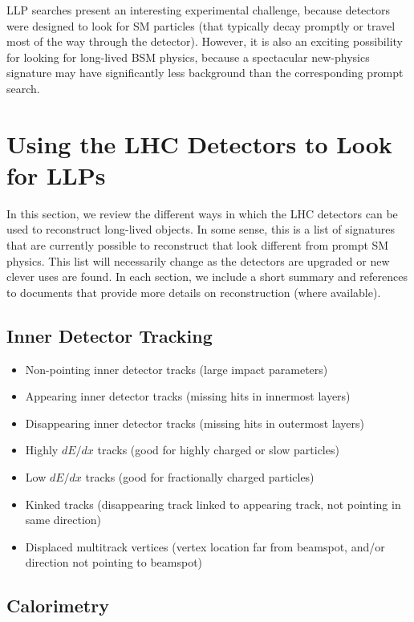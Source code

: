 LLP searches present an interesting experimental challenge, because detectors were designed to look for SM particles (that typically decay promptly or travel most of the way through the detector). However, it is also an exciting possibility for looking for long-lived BSM physics, because a spectacular new-physics signature may have significantly less background than the corresponding prompt search.

\section{Using the LHC Detectors to Look for LLPs}

In this section, we review the different ways in which the LHC detectors can be used to reconstruct long-lived objects. In some sense, this is a list of signatures that are currently possible to reconstruct that look different from prompt SM physics. This list will necessarily change as the detectors are upgraded or new clever uses are found. In each section, we include a short summary and references to documents that provide more details on reconstruction (where available).


\subsection{Inner Detector Tracking}

\begin{itemize}
\item Non-pointing inner detector tracks (large impact parameters)
\item Appearing inner detector tracks (missing hits in innermost layers)
\item Disappearing inner detector tracks (missing hits in outermost layers)
\item Highly $dE/dx$ tracks (good for highly charged or slow particles)
\item Low $dE/dx$ tracks (good for fractionally charged particles)
\item Kinked tracks (disappearing track linked to appearing track, not pointing in same direction)
\item Displaced multitrack vertices (vertex location far from beamspot, and/or direction not pointing to beamspot)
\end{itemize}

\subsection{Calorimetry}

